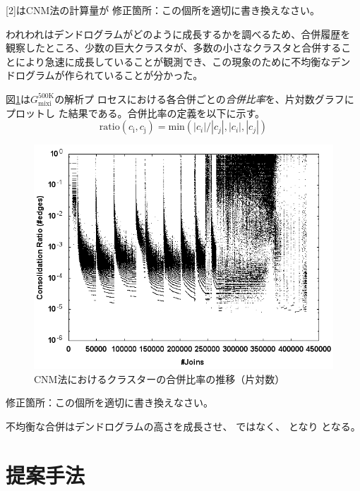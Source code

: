 \documentclass [a4j,11pt] {jsarticle}
\begin{document}
\begin {空欄ブロック}{{}[2]はCNM法の計算量が}
修正箇所：この個所を適切に書き換えなさい。
\end {空欄ブロック}

われわれはデンドログラムがどのように成長するかを調べるため、合併履歴を
観察したところ、少数の巨大クラスタが、多数の小さなクラスタと合併するこ
とにより急速に成長していることが観測でき、この現象のために不均衡なデン
ドログラムが作られていることが分かった。

図\ref {fig: clauset ratio}は$G_{\text {mixi}}^{\text {500K}}$の解析プ
ロセスにおける各合併ごとの\emph {合併比率}を、片対数グラフにプロットし
た結果である。合併比率の定義を以下に示す。
\[\text{ratio}(c_{\text{i}},c_{\text{j}}) = \text{min}(|c_i|/|c_j|,|c_i|,|c_j|)\]%

\begin {figure}[htbp]
  \centerline {\includegraphics [width=0.80\linewidth]{fig3-cnm-ratio-join.png}}
  \caption {CNM法におけるクラスターの合併比率の推移（片対数）}
  \label {fig: clauset ratio}
\end{figure}

修正箇所：この個所を適切に書き換えなさい。

不均衡な合併はデンドログラムの高さを成長させ、
ではなく、
となり
となる。


\section {提案手法}
\label {sect: algorithm}
\end{document}
